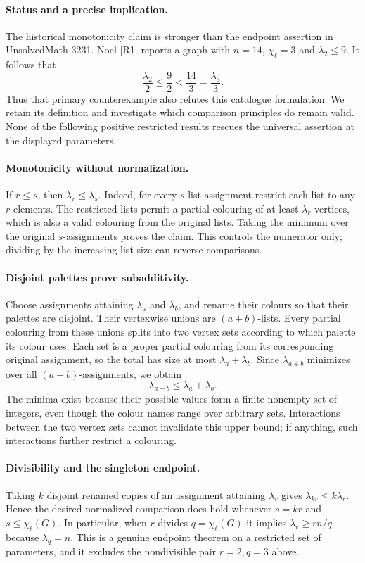 \documentclass[11pt,a4paper]{article}
\begin{document}
\paragraph{Status and a precise implication.}
The historical monotonicity claim is stronger than the endpoint assertion
in UnsolvedMath 3231. Noel [R1] reports a graph with $n=14$,
$\chi_\ell=3$ and $\lambda_2\le9$. It follows that
\[
           \frac{\lambda_2}{2}\le\frac92
           <\frac{14}{3}=\frac{\lambda_3}{3}.
\]
Thus that primary counterexample also refutes this catalogue formulation.
We retain its definition and investigate which comparison principles do
remain valid. None of the following positive restricted results rescues
the universal assertion at the displayed parameters.

\paragraph{Monotonicity without normalization.}
If $r\le s$, then $\lambda_r\le\lambda_s$. Indeed, for every $s$-list
assignment restrict each list to any $r$ elements. The restricted lists
permit a partial colouring of at least $\lambda_r$ vertices, which is
also a valid colouring from the original lists. Taking the minimum over
the original $s$-assignments proves the claim. This controls the numerator
only; dividing by the increasing list size can reverse comparisons.

\paragraph{Disjoint palettes prove subadditivity.}
Choose assignments attaining $\lambda_a$ and $\lambda_b$, and rename
their colours so that their palettes are disjoint. Their vertexwise
unions are $(a+b)$-lists. Every partial colouring from these unions
splits into two vertex sets according to which palette its colour uses.
Each set is a proper partial colouring from its corresponding original
assignment, so the total has size at most $\lambda_a+\lambda_b$.
Since $\lambda_{a+b}$ minimizes over all $(a+b)$-assignments, we obtain
\[
                         \lambda_{a+b}\le\lambda_a+\lambda_b.
\]
The minima exist because their possible values form a finite nonempty
set of integers, even though the colour names range over arbitrary sets.
Interactions between the two vertex sets cannot invalidate this upper
bound; if anything, such interactions further restrict a colouring.

\paragraph{Divisibility and the singleton endpoint.}
Taking $k$ disjoint renamed copies of an assignment attaining $\lambda_r$
gives $\lambda_{kr}\le k\lambda_r$. Hence the desired normalized comparison
does hold whenever $s=kr$ and $s\le\chi_\ell(G)$. In particular, when
$r$ divides $q=\chi_\ell(G)$ it implies $\lambda_r\ge rn/q$ because
$\lambda_q=n$. This is a genuine endpoint theorem on a restricted set
of parameters, and it excludes the nondivisible pair $r=2,q=3$ above.
\end{document}
